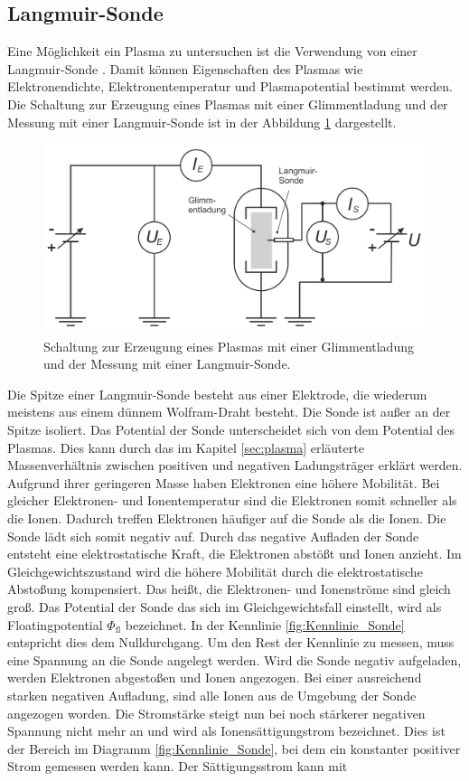 \subsection{Langmuir-Sonde}\label{sec:Langmuir_Sonde}  
Eine Möglichkeit ein Plasma zu untersuchen ist die Verwendung von einer Langmuir-Sonde \cite{anleitung}. Damit können Eigenschaften des Plasmas wie Elektronendichte, Elektronentemperatur und Plasmapotential bestimmt werden. Die Schaltung zur Erzeugung eines Plasmas mit einer Glimmentladung und der Messung mit einer Langmuir-Sonde ist in der Abbildung \ref{fig:Schaltung_Sonde} dargestellt. 
\begin{figure}[H]
\centering
\includegraphics[scale=0.4]{Schaltung_Sonde.PNG}
\caption{Schaltung zur Erzeugung eines Plasmas mit einer Glimmentladung und der Messung mit einer Langmuir-Sonde. \cite{anleitung}}
\label{fig:Schaltung_Sonde}
\end{figure}
Die Spitze einer Langmuir-Sonde besteht aus einer Elektrode, die wiederum meistens aus einem dünnem Wolfram-Draht besteht. Die Sonde ist außer an der Spitze isoliert. Das Potential der Sonde unterscheidet sich von dem Potential des Plasmas. Dies kann durch das im Kapitel \ref{sec:plasma} erläuterte Massenverhältnis zwischen positiven und negativen Ladungsträger erklärt werden. Aufgrund ihrer geringeren Masse haben Elektronen eine höhere Mobilität. Bei gleicher Elektronen- und Ionentemperatur sind die Elektronen somit schneller als die Ionen. Dadurch treffen Elektronen häufiger auf die Sonde als die Ionen. Die Sonde lädt sich somit negativ auf. Durch das negative Aufladen der Sonde entsteht eine elektrostatische Kraft, die Elektronen abstößt und  Ionen anzieht. Im Gleichgewichtszustand wird die höhere Mobilität durch die elektrostatische Abstoßung kompensiert. Das heißt, die Elektronen- und Ionenströme sind gleich groß. Das Potential der Sonde das sich im Gleichgewichtsfall einstellt, wird als Floatingpotential $\Phi_{\mathrm{fl}}$ bezeichnet. In der Kennlinie \ref{fig:Kennlinie_Sonde} entspricht dies dem  Nulldurchgang.  Um den Rest der Kennlinie zu messen, muss eine Spannung an die Sonde angelegt werden. Wird die Sonde negativ aufgeladen, werden Elektronen abgestoßen und Ionen angezogen. Bei einer ausreichend starken negativen Aufladung, sind alle Ionen aus de Umgebung der Sonde angezogen worden. Die Stromstärke steigt nun bei noch stärkerer negativen Spannung  nicht mehr an und wird als Ionensättigungstrom bezeichnet. Dies ist der Bereich im Diagramm \ref{fig:Kennlinie_Sonde}, bei dem ein konstanter positiver Strom gemessen werden kann. Der Sättigungsstrom kann mit
